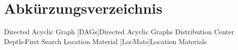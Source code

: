 \chapter*{Abkürzungsverzeichnis}

\begin{acronym}[WYSISWG] %


	 {Directed Acyclic Graph}
	[DAGs]{Directed Acyclic Graphs}
	 {Distribution Center}
	 {Depth-First Search}
	 {Location Material}
	[LocMats]{Location Materials}

\end{acronym}
